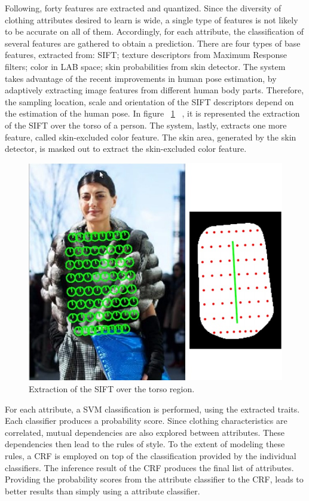\documentclass[titlepage,12pt,a4paper,times]{book}
\begin{document}
Following, forty features are extracted and quantized. Since the diversity of
clothing attributes desired to learn is wide, a single type of features is
not likely to be accurate on all of them. Accordingly, for each attribute, the
classification of several features are gathered to obtain a prediction. There
are four types of base features, extracted from: \ac{SIFT}; texture descriptors
from Maximum Response filters; color in LAB space; skin probabilities from skin
detector. The system takes advantage of the recent improvements in human pose
estimation, by adaptively extracting image features from different human body
parts. Therefore, the sampling location, scale and orientation of the \ac{SIFT}
descriptors depend on the estimation of the human pose. In figure ~\ref{fig:est}
~\citep{2}, it is represented the extraction of the \ac{SIFT} over the torso of
a person. The system, lastly, extracts one more feature, called skin-excluded
color feature. The skin area, generated by the skin detector, is masked out
to extract the skin-excluded color feature.

\begin{figure}[!h]
\centering
\includegraphics[scale=0.5]{images/2_3_fig3.jpg}
\caption{Extraction of the \ac{SIFT} over the torso region.}
\label{fig:est}
\end{figure}
\FloatBarrier

For each attribute, a \ac{SVM} classification is performed, using the
extracted traits. Each classifier produces a probability score.
Since clothing characteristics are correlated, mutual dependencies are also
explored between attributes. These dependencies then lead to the rules of style.
To the extent of modeling these rules, a \ac{CRF} is employed on top of the
classification provided by the individual classifiers. The inference result of
the \ac{CRF} produces the final list of attributes. Providing the probability
scores from the attribute classifier to the \ac{CRF}, leads to better results
than simply using a attribute classifier.
\end{document}
